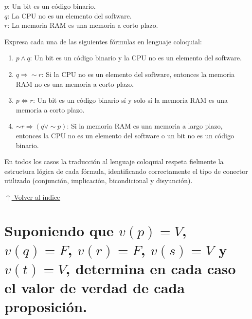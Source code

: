 \documentclass[12pt]{article}
\newcommand{\volverindice}{%
    \vspace{1em}%
    \begin{flushright}%
        \hyperlink{indice}{\small $\uparrow$ Volver al índice}%
    \end{flushright}%
}
\begin{document}
$p$: Un bit es un código binario.\\
$q$: La CPU no es un elemento del software.\\
$r$: La memoria RAM es una memoria a corto plazo.

Expresa cada una de las siguientes fórmulas en lenguaje coloquial:

\begin{enumerate}[label=\alph*.-]
    \item $p \wedge q$: Un bit es un código binario y la CPU no es un elemento del software.

    \item $q \Rightarrow \sim r$: Si la CPU no es un elemento del software, entonces la memoria RAM no es una memoria a corto plazo.

    \item $p \Leftrightarrow r$: Un bit es un código binario sí y solo sí la memoria RAM es una memoria a corto plazo.

    \item $\sim r \Rightarrow (q \vee \sim p)$: Si la memoria RAM es una memoria a largo plazo, entonces la CPU no es un elemento del software o un bit no es un código binario.
\end{enumerate}

En todos los casos la traducción al lenguaje coloquial respeta fielmente la estructura lógica de cada fórmula, identificando correctamente el tipo de conector utilizado (conjunción, implicación, bicondicional y disyunción).

\volverindice
\newpage


\section[Valor de verdad con valores dados]{Suponiendo que $v(p) = V$, $v(q) = F$, $v(r) = F$, $v(s) = V$ y $v(t) = V$, determina en cada caso el valor de verdad de cada proposición.}
\end{document}
